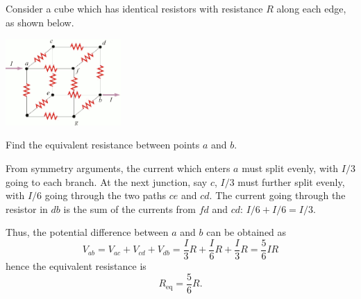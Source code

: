 \documentclass[makesolutionspdf]{esg8022pset}
\begin{document}
\begin{problem}{}
  Consider a cube which has identical resistors with resistance $R$ along each edge, as shown below.
  \begin{center}\includegraphics[width=0.33\textwidth]{ps07_06}\end{center}
  Find the equivalent resistance between points $a$ and $b$.
\end{problem}
\begin{solution}
  From symmetry arguments, the current which enters $a$ must split evenly, with $I / 3$ going to each branch.  At the next junction, say $c$, $I / 3$ must further split evenly, with $I / 6$ going through the two paths $ce$ and $cd$.  The current going through the resistor in $db$ is the sum of the currents from $fd$ and $cd$: $I / 6 + I / 6 = I / 3$.
  
  Thus, the potential difference between $a$ and $b$ can be obtained as
  $$V_{ab} = V_{ac} + V_{cd} + V_{db} = \frac{I}{3}R + \frac{I}{6}R + \frac{I}{3}R = \frac56 IR$$
  hence the equivalent resistance is
  $$R_{\text{eq}} = \frac56 R.$$
\end{solution}
\end{document}
